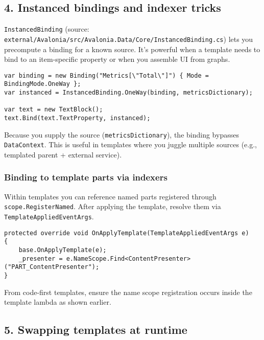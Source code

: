 \subsection{4. Instanced bindings and indexer
tricks}\label{instanced-bindings-and-indexer-tricks}

\passthrough{\lstinline!InstancedBinding!} (source:
\passthrough{\lstinline!external/Avalonia/src/Avalonia.Data/Core/InstancedBinding.cs!})
lets you precompute a binding for a known source. It's powerful when a
template needs to bind to an item-specific property or when you assemble
UI from graphs.

\begin{lstlisting}
var binding = new Binding("Metrics[\"Total\"]") { Mode = BindingMode.OneWay };
var instanced = InstancedBinding.OneWay(binding, metricsDictionary);

var text = new TextBlock();
text.Bind(text.TextProperty, instanced);
\end{lstlisting}

Because you supply the source
(\passthrough{\lstinline!metricsDictionary!}), the binding bypasses
\passthrough{\lstinline!DataContext!}. This is useful in templates where
you juggle multiple sources (e.g., templated parent + external service).

\subsubsection{Binding to template parts via
indexers}\label{binding-to-template-parts-via-indexers}

Within templates you can reference named parts registered through
\passthrough{\lstinline!scope.RegisterNamed!}. After applying the
template, resolve them via
\passthrough{\lstinline!TemplateAppliedEventArgs!}.

\begin{lstlisting}
protected override void OnApplyTemplate(TemplateAppliedEventArgs e)
{
    base.OnApplyTemplate(e);
    _presenter = e.NameScope.Find<ContentPresenter>("PART_ContentPresenter");
}
\end{lstlisting}

From code-first templates, ensure the name scope registration occurs
inside the template lambda as shown earlier.

\subsection{5. Swapping templates at
runtime}\label{swapping-templates-at-runtime}

